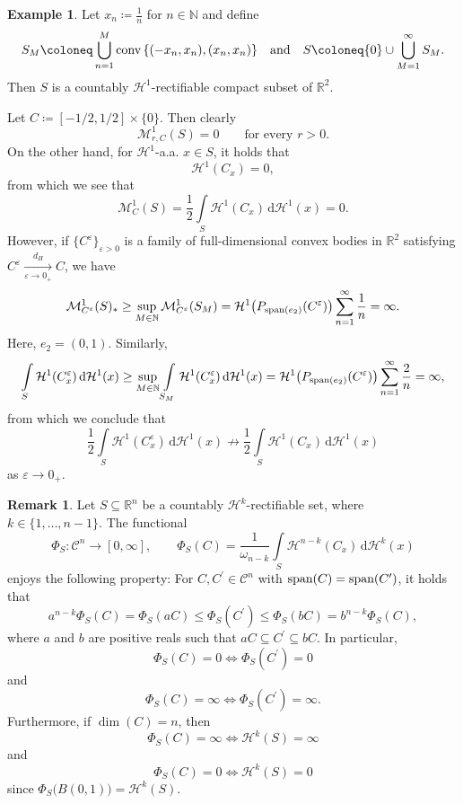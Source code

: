 \documentclass[pdflatex,sn-mathphys-num]{sn-jnl}
\theoremstyle{plain}
\theoremstyle{definition}
\newtheorem{rem}[theorem]{Remark}
\newtheorem{example}[theorem]{Example}
\DeclareMathOperator{\LO}{\textup{span}}
\DeclareMathOperator{\conv}{\textup{conv}}
\newcommand{\dH}[1]{\,\mathrm d\mathcal{H}^{#1}}
\begin{document}
\begin{example}\label{E1}
    Let $x_n\coloneq\frac{1}{n}$ for $n\in\mathbb{N}$ and define \begin{align*}
        S_M\coloneq\bigcup_{n=1}^{M}\conv\left\{(-x_n, x_n), (x_n, x_n)\right\}&&\text{and}&&S\coloneq\{0\}\cup\bigcup_{M=1}^{\infty}S_M.
    \end{align*} Then $S$ is a countably $\mathcal{H}^1$-rectifiable compact subset of $\mathbb{R}^2$. 
    
    Let $C\coloneq[-1/2, 1/2]\times\{0\}$. Then clearly $$\mathcal{M}^1_{r, C}(S)=0\qquad\text{for every $r>0$.}$$ On the other hand, for $\mathcal{H}^1$-a.a. $x\in S$, it holds that $$\mathcal{H}^1(C_x)=0,$$ from which we see that $$\mathcal{M}^1_{C}(S)=\frac{1}{2}\int\limits_{S}\mathcal{H}^{1}(C_x)\dH{1}(x)=0.$$ However, if $\{C^{\varepsilon}\}_{\varepsilon>0}$ is a family of full-dimensional convex bodies in $\mathbb{R}^2$ satisfying $C^{\varepsilon}\xrightarrow[\varepsilon\to0_+]{d_H} C$, we have 
$$\mathcal{M}^{1}_{C^{\varepsilon}}(S)_*\geq\sup_{M\in\mathbb{N}}\mathcal{M}^{1}_{C^{\varepsilon}}(S_M)=\mathcal{H}^1\big(P_{\LO(e_2)}(C^{\varepsilon})\big)\sum_{n=1}^{\infty}\frac{1}{n}=\infty.$$ Here, $e_2=(0, 1)$. Similarly, $$\int\limits_S\mathcal{H}^1(C^{\varepsilon}_x)\dH{1}(x)\geq\sup_{M\in\mathbb{N}}\int\limits_{S_M}\mathcal{H}^1(C^{\varepsilon}_x)\dH{1}(x)=\mathcal{H}^1\big(P_{\LO(e_2)}(C^{\varepsilon})\big)\sum_{n=1}^{\infty}\frac{2}{n}=\infty,$$ from which we conclude that $$\frac{1}{2}\int\limits_{S}\mathcal{H}^{1}(C^{\varepsilon}_x)\dH{1}(x)\not\rightarrow\frac{1}{2}\int\limits_{S}\mathcal{H}^{1}(C_x)\dH{1}(x)$$ as $\varepsilon\to0_+.$
\end{example}

\begin{rem}\label{0inf2}
    Let $S\subseteq\mathbb{R}^n$ be a countably $\mathcal{H}^k$-rectifiable set, where $k\in\{1, \dots, n-1\}$. The functional $$\Phi_S\colon \mathcal{C}^n\to [0, \infty], \qquad \Phi_S(C)=\frac{1}{\omega_{n-k}}\int\limits_{S}\mathcal{H}^{n-k}(C_x)\dH{k}(x)$$ enjoys the following property: For $C, C^{\prime}\in\mathcal{C}^n$ with $\LO(C)=\LO(C^{\prime})$, it holds that $$a^{n-k}\Phi_S(C)=\Phi_S(aC)\leq\Phi_S(C^{\prime})\leq\Phi_S(bC)=b^{n-k}\Phi_S(C),$$ where $a$ and $b$ are positive reals such that $aC\subseteq C^{\prime}\subseteq bC.$ In particular, $$\Phi_S(C)=0\iff \Phi_S(C^{\prime})=0$$ and $$\Phi_S(C)=\infty\iff \Phi_S(C^{\prime})=\infty.$$ Furthermore, if $\dim(C)=n$, then $$\Phi_S(C)=\infty \iff \mathcal{H}^k(S)=\infty$$ and $$\Phi_S(C)=0 \iff \mathcal{H}^k(S)=0$$ since $\Phi_S\big(B(0, 1)\big)=\mathcal{H}^k(S).$
\end{rem}
\end{document}
